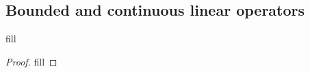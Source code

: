 \subsection{Bounded and continuous linear operators}

\begin{exercise}{1}
fill
\end{exercise}
\begin{proof}
fill
\end{proof}
